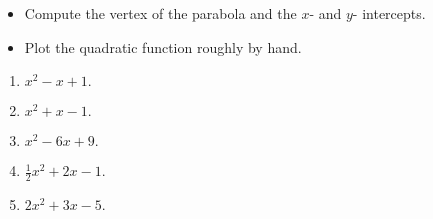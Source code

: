 \begin{itemize}
\item Compute the vertex of the parabola and the $x$- and $y$- intercepts.
\item  Plot the quadratic function roughly by hand.
\end{itemize}

\begin{enumerate}[ref={\fcProblemRef}]
\item $x^2-x+1.$
\item $x^2+x-1.$
\item $x^2-6x+9.$
\item $\frac{1}{2}x^2+2x-1.$
\item $2x^2+3x-5.$
\end{enumerate}